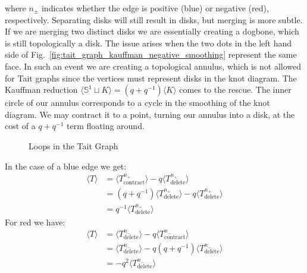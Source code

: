             where $n_{\pm}$ indicates whether the edge is positive (blue) or
            negative (red), respectively.
            Separating disks will still result in disks, but
            merging is more subtle. If we are merging two distinct disks we are
            essentially creating a dogbone, which is still topologically a
            disk. The issue arises when the two dots in the left hand side of
            Fig.~\ref{fig:tait_graph_kauffman_negative_smoothing} represent
            the same face. In such an event we are creating a topological
            annulus, which is not allowed for Tait graphs since the vertices
            must represent disks in the knot diagram. The Kauffman reduction
            $\langle{\mathbb{S}^{1}\sqcup{K}}\rangle=(q+q^{-1})\langle{K}\rangle$
            comes to the rescue. The inner circle of our annulus corresponds to
            a cycle in the smoothing of the knot diagram. We may contract it to
            a point, turning our annulus into a disk, at the cost of a
            $q+q^{-1}$ term floating around.
            \begin{figure}
                \centering
                \caption{Loops in the Tait Graph}
                \label{fig:tait_graph_reidemeister_1_dual}
            \end{figure}
            \par\hfill\par
            In the case of a blue edge we get:
            \begin{align}
                \langle{T}\rangle
                &=\langle{T^{n_{+}}_{\textrm{contract}}}\rangle
                -q\langle{T^{n_{+}}_{\textrm{delete}}}\rangle\\
                &=(q+q^{-1})\langle{T^{n_{+}}_{\textrm{delete}}}\rangle
                -q\langle{T^{n_{+}}_{\textrm{delete}}}\rangle\\
                &=q^{-1}\langle{T^{n_{+}}_{\textrm{delete}}}\rangle
            \end{align}
            For red we have:
            \begin{align}
                \label{eqn:tait_graph_kauffman_bracket_negative_loop_reduction}
                \langle{T}\rangle
                &=\langle{{T^{n_{-}}_{\textrm{delete}}}}\rangle
                -q\langle{{T^{n_{-}}_{\textrm{contract}}}}\rangle\\
                &=\langle{{T^{n_{-}}_{\textrm{delete}}}}\rangle
                -q(q+q^{-1})\langle{{T^{n_{-}}_{\textrm{delete}}}}\rangle\\
                &=-q^{2}\langle{{T^{n_{-}}_{\textrm{delete}}}}\rangle
            \end{align}
